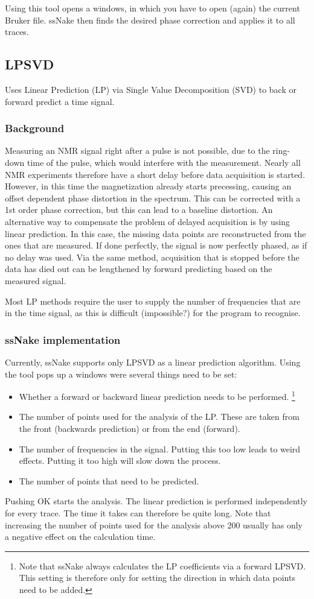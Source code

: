 \documentclass[11pt,a4paper]{article}
\begin{document}
Using this tool opens a windows, in which you have to open (again) the current Bruker file. ssNake then finds the desired phase correction and applies it to all traces. 

\subsection{LPSVD}
Uses Linear Prediction (LP) via Single Value Decomposition (SVD) to back or forward predict a time signal.

\subsubsection*{Background}
Measuring an NMR signal right after a pulse is not possible, due to the ring-down time of the pulse, which would interfere with the measurement. Nearly all NMR experiments therefore have a short delay before data acquisition is started. However, in this time the magnetization already starts precessing, causing an offset dependent phase distortion in the spectrum. This can be corrected with a 1st order phase correction, but this can lead to a baseline distortion. An alternative way to compensate the problem of delayed acquisition is by using linear prediction. In this case, the missing data points are reconstructed from the ones that are measured. If done perfectly, the  signal is now perfectly phased, as if no delay was used. Via the same method, acquisition that is stopped before the data has died out can be lengthened by forward predicting based on the measured signal.

Most LP methods require the user to supply the number of frequencies that are in the time signal, as this is difficult (impossible?) for the program to recognise.

\subsubsection*{ssNake implementation}
Currently, ssNake supports only LPSVD as a linear prediction algorithm. Using the tool pops up a windows were several things need to be set:
\begin{itemize}
\item Whether a forward or backward linear prediction needs to be performed. \footnote{Note that ssNake always calculates the LP coefficients via a forward LPSVD. This setting is therefore only for setting the direction in which data points need to be added.}
\item The number of points used for the analysis of the LP. These are taken from the front (backwards prediction) or from the end (forward).
\item The number of frequencies in the signal. Putting this too low leads to weird effects. Putting it too high will slow down the process.
\item The number of points that need to be predicted.
\end{itemize}
Pushing OK starts the analysis. The linear prediction is performed independently for every trace. The time it takes can therefore be quite long. Note that increasing the number of points used for the analysis above 200 usually has only a negative effect on the calculation time.
\end{document}
